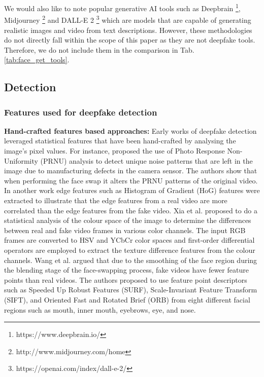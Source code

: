 We would also like to note popular generative AI tools such as Deepbrain
\footnote{https://www.deepbrain.io/}, Midjourney \footnote{http://www.midjourney.com/home} and DALL-E 2 \footnote{https://openai.com/index/dall-e-2/} which are models that are capable of generating realistic images and video from text descriptions. However, these methodologies do not directly fall within the scope of this paper as they are not deepfake tools. Therefore, we do not include them in the comparison in Tab. \ref{tab:face_get_tools}. 


\hspace{2mm}
\subsection{Detection}
\subsubsection{Features used for deepfake detection}
\noindent\textbf{Hand-crafted features based approaches:} Early works of deepfake detection leveraged statistical features that have been hand-crafted by analysing the image's pixel values. For instance, \cite{koopman2018detection} proposed the use of Photo Response Non-Uniformity (PRNU) analysis to detect unique noise patterns that are left in the image due to manufacturing defects in the camera sensor. The authors show that when performing the face swap it alters the PRNU patterns of the original video. In another work \cite{kharbat2019image} edge features such as Histogram of Gradient (HoG) features were extracted to illustrate that the edge features from a real video are more correlated than the edge features from the fake video. Xia et al. \cite{xia2022towards} proposed to do a statistical analysis of the colour space of the image to determine the differences between real and fake video frames in various color channels. The input RGB frames are converted to HSV and YCbCr color spaces and first-order differential operators are employed to extract the texture difference features from the colour channels. Wang et al. \cite{wang2022ffr_fd} argued that due to the smoothing of the face region during the blending stage of the face-swapping process, fake videos have fewer feature points than real videos. The authors proposed to use feature point descriptors such as Speeded Up Robust Features (SURF), Scale-Invariant Feature Transform (SIFT), and Oriented Fast and Rotated Brief (ORB) from eight different facial regions such as mouth, inner mouth, eyebrows, eye, and nose. 

